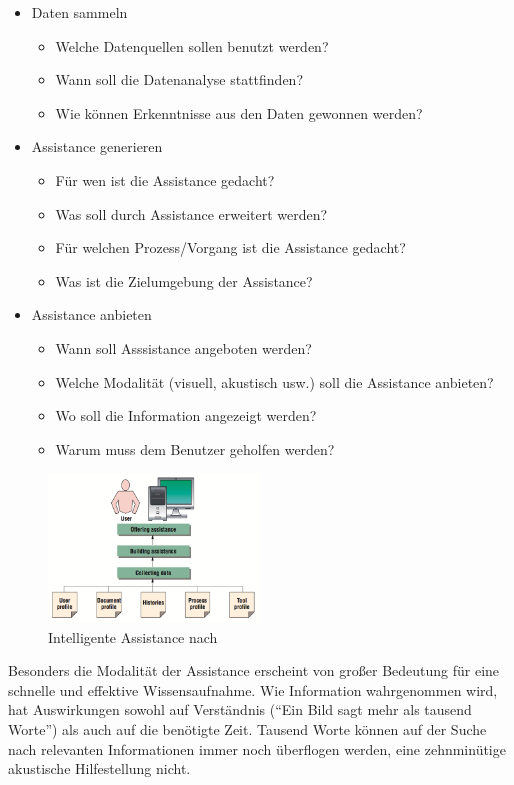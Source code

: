 \documentclass[
	headsepline,
	footsepline,
	fontsize=12pt,
	bibliography=totoc
]{scrbook}
\begin{document}
\begin{itemize}

	\item Daten sammeln
	\begin{itemize}
		\item Welche Datenquellen sollen benutzt werden?
		\item Wann soll die Datenanalyse stattfinden?
		\item Wie können Erkenntnisse aus den Daten gewonnen werden?
	\end{itemize}
	\item Assistance generieren
	\begin{itemize}
		\item Für wen ist die Assistance gedacht?
		\item Was soll durch Assistance erweitert werden?
		\item Für welchen Prozess/Vorgang ist die Assistance gedacht?
		\item Was ist die Zielumgebung der Assistance?
	\end{itemize}
	\item Assistance anbieten
	\begin{itemize}
		\item Wann soll Asssistance angeboten werden?
		\item Welche Modalität (visuell, akustisch usw.) soll die Assistance anbieten?
		\item Wo soll die Information angezeigt werden?
		\item Warum muss dem Benutzer geholfen werden?
	\end{itemize}
\end{itemize}

\begin{figure}[htbp]
   \centering
   \includegraphics[width=0.5\textwidth]{images/grundlagen-intelligent_assistance.png}
   \caption{Intelligente Assistance nach \cite{Rech2007}}
   \label{figure:intelligent_assistance}
\end{figure}

Besonders die Modalität der Assistance erscheint von großer Bedeutung für eine schnelle und effektive Wissensaufnahme. Wie Information wahrgenommen wird, hat Auswirkungen sowohl auf Verständnis (\enquote{Ein Bild sagt mehr als tausend Worte}) als auch auf die benötigte Zeit. Tausend Worte können auf der Suche nach relevanten Informationen immer noch überflogen werden, eine zehnminütige akustische Hilfestellung nicht.
\end{document}
